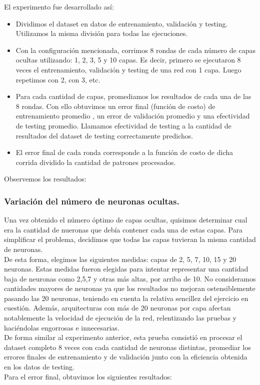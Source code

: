 El experimento fue desarrollado así: 
\begin{itemize}
\item Dividimos el dataset en datos de entrenamiento, validación y testing. Utilizamos la misma división para todas las ejecuciones.
\item Con la configuración mencionada, corrimos 8 rondas de cada número de capas ocultas utilizando: 1, 2, 3, 5 y 10 capas.
Es decir, primero se ejecutaron 8 veces el entrenamiento, validación y testing de una red con 1 capa. Luego repetimos con 2, con 3, etc.
\item Para cada cantidad de capas, promediamos los resultados de cada una de las 8 rondas. Con ello obtuvimos un error final (función de costo) de entrenamiento promedio , un error de validación promedio y una efectividad de testing promedio. Llamamos efectividad de testing a la cantidad de resultados del dataset de testing correctamente predichos.
\item El error final de cada ronda corresponde a la función de costo de dicha corrida dividido la cantidad de patrones procesados.
\end{itemize}

Observemos los resultados:

\subsubsection{Variación del número de neuronas ocultas.}
Una vez obtenido el número óptimo de capas ocultas, quisimos determinar cual era la cantidad de nueronas que debía contener
cada una de estas capas. Para simplificar el problema, decidimos que todas las capas tuvieran la misma cantidad de neuronas.\\
De esta forma, elegimos las siguientes medidas: capas de 2, 5, 7, 10, 15 y 20 neuronas. Estas medidas fueron elegidas para intentar representar una cantidad baja de neuronas como 2,5,7 y otras más altas, por arriba de 10. No consideramos cantidades mayores de neuronas ya que los resultados no mejoran ostensiblemente pasando las 20 neuronas, teniendo en cuenta la relativa
sencillez del ejercicio en cuestión. Además, arquitecturas con más de 20 neuronas por capa afectan notablemente la velocidad de ejecución de la red, relentizando las pruebas y haciéndolas engorrosas e innecesarias.\\

De forma similar al experimento anterior, esta prueba consistió en procesar el dataset completo 8 veces con cada cantidad de neuronas distintas, promediar los errores finales de entrenamiento y de validación junto con la eficiencia obtenida en los datos de testing.\\
Para el error final, obtuvimos los siguientes resultados:

